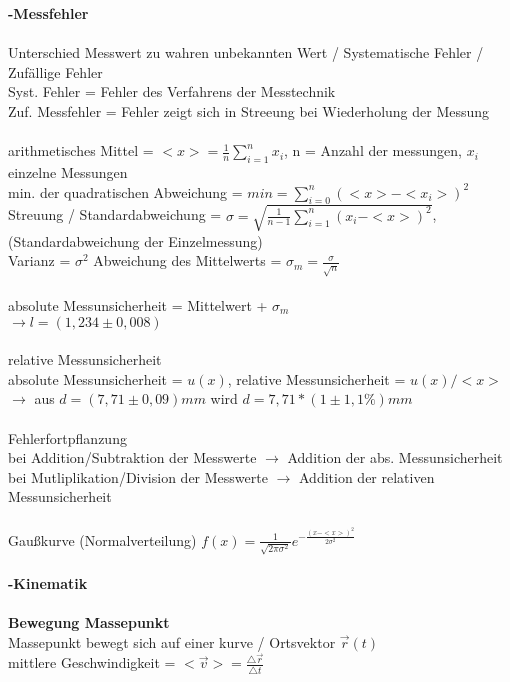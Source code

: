 \documentclass[8pt]{article}
\begin{document}
\noindent
\textbf{{\large -Messfehler}}\\ \\
\noindent
Unterschied Messwert zu wahren unbekannten Wert / Systematische Fehler / Zufällige Fehler\\
Syst. Fehler = Fehler des Verfahrens der Messtechnik\\
Zuf. Messfehler = Fehler zeigt sich in Streeung bei Wiederholung der Messung\\ \\
arithmetisches Mittel = $<x> = \frac{1}{n} \sum_{i=1}^n x_i$, n = Anzahl der messungen, $x_i$ einzelne Messungen\\
min. der quadratischen Abweichung = $min = \sum_{i=0}^n(<x>-<x_i>)^2$\\
Streuung / Standardabweichung = $\sigma = \sqrt{\frac{1}{n-1}\sum_{i=1}^n (x_i-<x>)^2}$, (Standardabweichung der Einzelmessung) \\
Varianz = $\sigma^2$
Abweichung des Mittelwerts = $\sigma_m = \frac{\sigma}{\sqrt{n}}$ \\ \\
absolute Messunsicherheit = Mittelwert + $\sigma_m$ \\
$\rightarrow l=(1,234 \pm 0,008)$ \\ \\
relative Messunsicherheit\\
absolute Messunsicherheit = $u(x)$, relative Messunsicherheit = $u(x)/<x>$ \\
\noindent
$\rightarrow$ aus $d=(7,71 \pm 0,09)mm$ wird $d=7,71 * (1 \pm 1,1\%)mm$\\ \\
\noindent
Fehlerfortpflanzung \\
bei Addition/Subtraktion der Messwerte $\rightarrow$ Addition der abs. Messunsicherheit \\
bei Mutliplikation/Division der Messwerte $\rightarrow$ Addition der relativen Messunsicherheit\\ \\
\noindent
Gaußkurve (Normalverteilung) $f(x)=\frac{1}{\sqrt{2\pi\sigma^2}}e^{-\frac{(x-<x>)^2}{2\sigma^2}}$ 
\\ \\
\textbf{{\large -Kinematik}} \\ \\
\noindent
\textbf{Bewegung Massepunkt}\\
Massepunkt bewegt sich auf einer kurve / Ortsvektor $\overrightarrow{r}(t)$ \\
mittlere Geschwindigkeit = $<\overrightarrow{v}> = \frac{ \bigtriangleup \overrightarrow{r}}{\bigtriangleup t}$ \\
\end{document}
